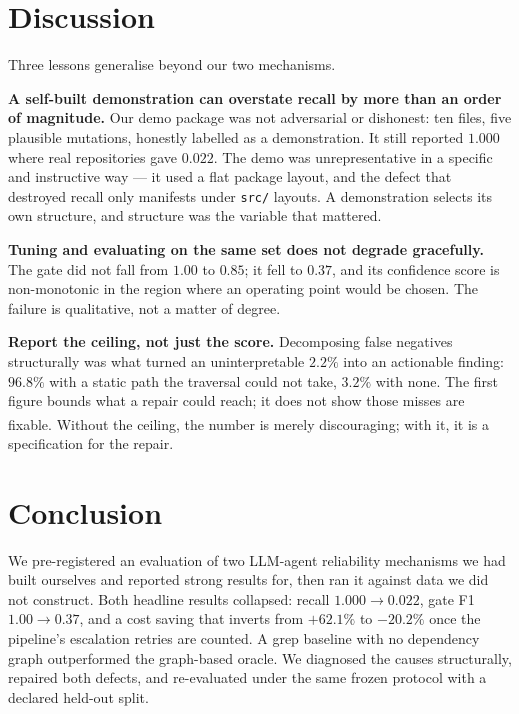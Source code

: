 \documentclass[sigconf,review,anonymous]{acmart}
\newcommand{\corr}{\textsuperscript{\dag}}
\begin{document}
\section{Discussion}\label{sec:discussion}

Three lessons generalise beyond our two mechanisms.

\textbf{A self-built demonstration can overstate recall by more than an order of magnitude.}
Our demo package was not adversarial or dishonest: ten files, five plausible mutations, honestly
labelled as a demonstration. It still reported $1.000$ where real repositories gave $0.022$. The
demo was unrepresentative in a specific and instructive way --- it used a flat package layout, and
the defect that destroyed recall only manifests under \texttt{src/} layouts. A demonstration
selects its own structure, and structure was the variable that mattered.

\textbf{Tuning and evaluating on the same set does not degrade gracefully.} The gate did not fall
from $1.00$ to $0.85$; it fell to $0.37$, and its confidence score is non-monotonic in the region
where an operating point would be chosen. The failure is qualitative, not a matter of degree.

\textbf{Report the ceiling, not just the score.} Decomposing false negatives structurally was what
turned an uninterpretable $2.2\%$ into an actionable finding: $96.8\%$ with a static path the
traversal could not take, $3.2\%$ with none. The first figure bounds what a repair could reach; it
does not show those misses are fixable\corr{}. Without the ceiling, the number is merely discouraging; with it, it is a specification
for the repair.

\section{Conclusion}\label{sec:conclusion}

We pre-registered an evaluation of two LLM-agent reliability mechanisms we had built ourselves and
reported strong results for, then ran it against data we did not construct. Both headline results
collapsed: recall $1.000 \rightarrow 0.022$, gate F1 $1.00 \rightarrow 0.37$, and a cost saving
that inverts from $+62.1\%$ to $-20.2\%$ once the pipeline's escalation retries are counted. A grep baseline with no dependency graph
outperformed the graph-based oracle. We diagnosed the causes structurally, repaired both defects,
and re-evaluated under the same frozen protocol with a declared held-out split.
\end{document}
